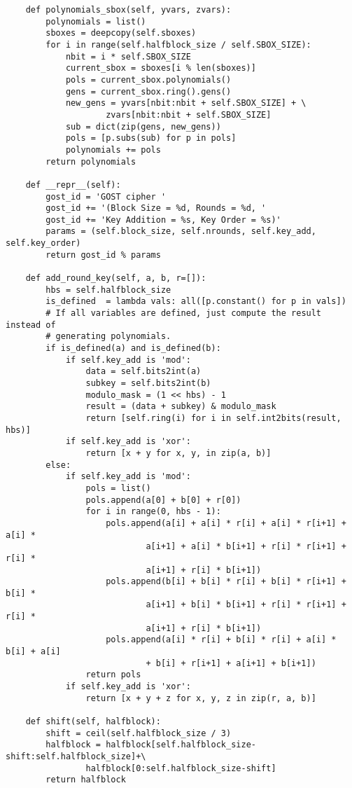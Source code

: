 \begin{appendices}
\begin{lstlisting}
    def polynomials_sbox(self, yvars, zvars):
        polynomials = list()
        sboxes = deepcopy(self.sboxes)
        for i in range(self.halfblock_size / self.SBOX_SIZE):
            nbit = i * self.SBOX_SIZE
            current_sbox = sboxes[i % len(sboxes)]
            pols = current_sbox.polynomials()
            gens = current_sbox.ring().gens()
            new_gens = yvars[nbit:nbit + self.SBOX_SIZE] + \
                    zvars[nbit:nbit + self.SBOX_SIZE] 
            sub = dict(zip(gens, new_gens))
            pols = [p.subs(sub) for p in pols]
            polynomials += pols
        return polynomials

    def __repr__(self):
        gost_id = 'GOST cipher '
        gost_id += '(Block Size = %d, Rounds = %d, '
        gost_id += 'Key Addition = %s, Key Order = %s)' 
        params = (self.block_size, self.nrounds, self.key_add, self.key_order)
        return gost_id % params

    def add_round_key(self, a, b, r=[]):
        hbs = self.halfblock_size
        is_defined  = lambda vals: all([p.constant() for p in vals])
        # If all variables are defined, just compute the result instead of
        # generating polynomials.
        if is_defined(a) and is_defined(b):
            if self.key_add is 'mod':
                data = self.bits2int(a)
                subkey = self.bits2int(b)
                modulo_mask = (1 << hbs) - 1
                result = (data + subkey) & modulo_mask
                return [self.ring(i) for i in self.int2bits(result, hbs)]
            if self.key_add is 'xor':
                return [x + y for x, y, in zip(a, b)]    
        else:
            if self.key_add is 'mod':
                pols = list()
                pols.append(a[0] + b[0] + r[0]) 
                for i in range(0, hbs - 1):
                    pols.append(a[i] + a[i] * r[i] + a[i] * r[i+1] + a[i] *
                            a[i+1] + a[i] * b[i+1] + r[i] * r[i+1] + r[i] *
                            a[i+1] + r[i] * b[i+1])
                    pols.append(b[i] + b[i] * r[i] + b[i] * r[i+1] + b[i] *
                            a[i+1] + b[i] * b[i+1] + r[i] * r[i+1] + r[i] *
                            a[i+1] + r[i] * b[i+1])
                    pols.append(a[i] * r[i] + b[i] * r[i] + a[i] * b[i] + a[i]
                            + b[i] + r[i+1] + a[i+1] + b[i+1])
                return pols
            if self.key_add is 'xor':
                return [x + y + z for x, y, z in zip(r, a, b)]    

    def shift(self, halfblock):
        shift = ceil(self.halfblock_size / 3)
        halfblock = halfblock[self.halfblock_size-shift:self.halfblock_size]+\ 
                halfblock[0:self.halfblock_size-shift]
        return halfblock


\end{lstlisting}
\end{appendices}
